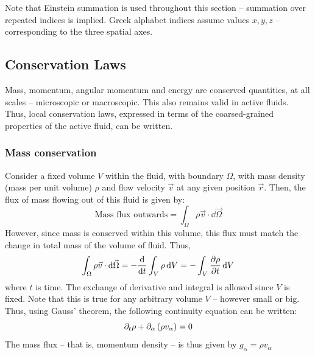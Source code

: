Note that Einstein summation is used throughout this section -- summation over repeated indices is implied. Greek alphabet indices assume values $x,y,z$ -- corresponding to the three spatial axes.

\subsection{Conservation Laws}\label{subsec:conservationLaws}
Mass, momentum, angular momentum and energy are conserved quantities, at all scales -- microscopic or macroscopic. This also remains valid in active fluids. Thus, local conservation laws, expressed in terms of the coarsed-grained properties of the active fluid, can be written. 

\subsubsection{Mass conservation}\label{subsubsec:massConserve}
Consider a fixed volume $V$ within the fluid, with boundary $\Omega$, with mass density (mass per unit volume) $\rho$ and flow velocity $\vec{v}$ at any given position $\vec{r}$. Then, the flux of mass flowing out of this fluid is given by:
\begin{equation*}
    \textrm{Mass flux outwards} = \int_{\Omega} \rho \vec{v}\cdot\dd{\vec{\Omega}}
\end{equation*}
However, since mass is conserved within this volume, this flux must match the change in total mass of the volume of fluid. Thus,
\begin{equation*}
    \int_{\Omega} \rho \vec{v}\cdot\dd{\vec{\Omega}} = - \dv{t}\int_V \rho \dd{V} = - \int_V \pdv{\rho}{t} \dd{V}
\end{equation*}
where $t$ is time. The exchange of derivative and integral is allowed since $V$ is fixed. Note that this is true for any arbitrary volume $V$ -- however small or big. Thus, using Gauss' theorem, the following continuity equation can be written:
\begin{equation}\label{eq:introMassBalance}
    \inlinePartial{t}{\rho} + \inlinePartial{\alpha}{\left(\rho v_\alpha\right)} = 0
\end{equation}
The mass flux -- that is, momentum density -- is thus given by $g_\alpha = \rho v_\alpha$


